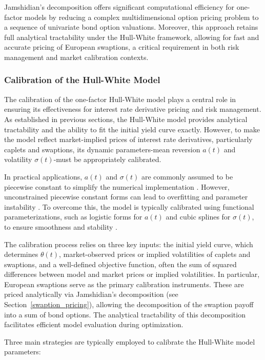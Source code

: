 Jamshidian’s decomposition offers significant computational efficiency for one-factor models by reducing a complex multidimensional option pricing problem to a sequence of univariate bond option valuations. Moreover, this approach retains full analytical tractability under the Hull-White framework, allowing for fast and accurate pricing of European swaptions, a critical requirement in both risk management and market calibration contexts.

\subsubsection{Calibration of the Hull-White Model}
The calibration of the one-factor Hull-White model plays a central role in ensuring its effectiveness for interest rate derivative pricing and risk management. As established in previous sections, the Hull-White model provides analytical tractability and the ability to fit the initial yield curve exactly. However, to make the model reflect market-implied prices of interest rate derivatives, particularly caplets and swaptions, its dynamic parameters-mean reversion $a(t)$ and volatility $\sigma(t)$-must be appropriately calibrated.

In practical applications, $a(t)$ and $\sigma(t)$ are commonly assumed to be piecewise constant to simplify the numerical implementation \parencite[p.~7]{gurrieri2009calibration}. However, unconstrained piecewise constant forms can lead to overfitting and parameter instability \parencite[p.~2]{gurrieri2009calibration}. To overcome this, the model is typically calibrated using functional parameterizations, such as logistic forms for $a(t)$ and cubic splines for $\sigma(t)$, to ensure smoothness and stability \parencite[p.~8]{gurrieri2009calibration}.

The calibration process relies on three key inputs: the initial yield curve, which determines $\theta(t)$, market-observed prices or implied volatilities of caplets and swaptions, and a well-defined objective function, often the sum of squared differences between model and market prices or implied volatilities. In particular, European swaptions serve as the primary calibration instruments. These are priced analytically via Jamshidian’s decomposition (see Section~\ref{swaption_pricing}), allowing the decomposition of the swaption payoff into a sum of bond options. The analytical tractability of this decomposition facilitates efficient model evaluation during optimization.

Three main strategies are typically employed to calibrate the Hull-White model parameters:

